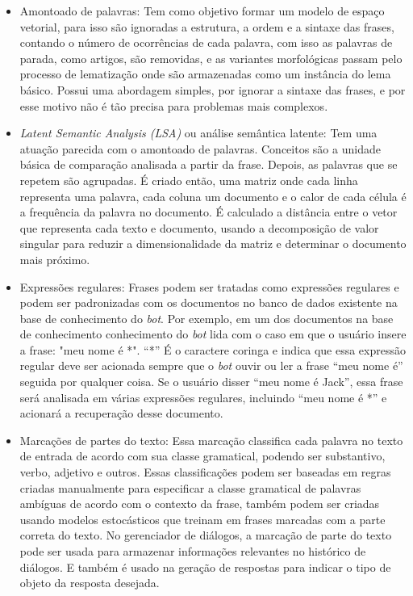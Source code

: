 \documentclass[
	12pt,				%
	oneside,
	a4paper,			%
	english,			%
	french,				%
	spanish,			%
	brazil				%
	]{abntex2}
\begin{document}
\begin{itemize}
	\item Amontoado de palavras: Tem como objetivo formar um modelo de espaço vetorial, para isso são ignoradas a estrutura, a ordem e a sintaxe das frases, contando o número de ocorrências de cada palavra, com isso as palavras de parada, como artigos, são removidas, e as variantes morfológicas passam pelo processo de lematização onde são armazenadas como um instância do lema básico. Possui uma abordagem simples, por ignorar a sintaxe das frases, e por esse motivo não é tão precisa para problemas mais complexos.
	\item \emph{Latent Semantic Analysis (LSA)} ou análise semântica latente: Tem uma atuação parecida com o amontoado de palavras. Conceitos são a unidade básica de comparação analisada a partir da frase. Depois, as palavras que se repetem são agrupadas. É criado então, uma matriz onde cada linha representa uma palavra, cada coluna um documento e o calor de cada célula é a frequência da palavra no documento. É calculado a distância entre o vetor que representa cada texto e documento, usando a decomposição de valor singular para reduzir a dimensionalidade da matriz e determinar o documento mais próximo.
	\item Expressões regulares: Frases podem ser tratadas como expressões regulares e podem ser padronizadas com os documentos no banco de dados existente na base de conhecimento do \emph{bot}. Por exemplo, em um dos documentos na base de conhecimento conhecimento do \emph{bot} lida com o caso em que o usuário insere a frase: "meu nome é *". “*” É o caractere coringa e indica que essa expressão regular deve ser acionada sempre que o \emph{bot} ouvir ou ler a frase “meu nome é” seguida por qualquer coisa. Se o usuário disser “meu nome é Jack”, essa frase será analisada em várias expressões regulares, incluindo “meu nome é *” e acionará a recuperação desse documento. 
	\item Marcações de partes do texto: Essa marcação classifica cada palavra no texto de entrada de acordo com sua classe gramatical, podendo ser substantivo, verbo, adjetivo e outros. Essas classificações podem ser baseadas em regras criadas manualmente para especificar a classe gramatical de palavras ambíguas de acordo com o contexto da frase, também podem ser criadas usando modelos estocásticos que treinam em frases marcadas com a parte correta do texto. No gerenciador de diálogos, a marcação de parte do texto pode ser usada para armazenar informações relevantes no histórico de diálogos. E também é usado na geração de respostas para indicar o tipo de objeto da resposta desejada. 

\end{itemize}
\end{document}
